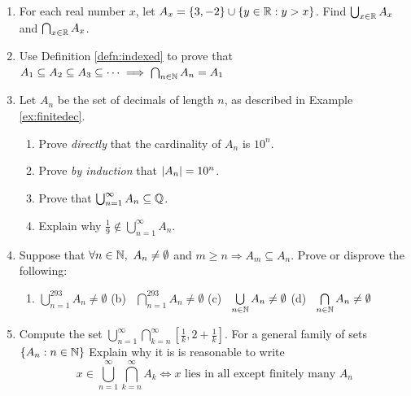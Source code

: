 \begin{exercises}{}{}
\begin{enumerate}
	
	  \item For each real number $x$, let $A_x=\{3,-2\}\cup\{y\in\mathbb{R}:y>x\}$. Find $\bigcup_{x\in\mathbb{R}}A_x$ and $\bigcap_{x\in\mathbb{R}}A_x$.
	  
	  
	  \item Use Definition \ref{defn:indexed} to prove that $A_1\subseteq A_2\subseteq A_3\subseteq\cdots\implies \bigcap_{n\in\mathbb{N}}A_n=A_1$
		
	
			
			
		\item Let $A_n$ be the set of decimals of length $n$, as described in Example \ref{ex:finitedec}.
		\begin{enumerate}
		  \item Prove \emph{directly} that the cardinality of $A_n$ is $10^n$. 
		  \item Prove \emph{by induction} that $\left| A_n\right|=10^n$.
		  \item Prove that $\bigcup_{n=1}^\infty A_n\subseteq\mathbb{Q}$.
			\item Explain why $\frac 19\notin\bigcup_{n=1}^\infty A_n$.
		\end{enumerate}
	
	
	  \item Suppose that $\forall n\in\N,\ A_n\neq\emptyset$ and $m\ge n\Longrightarrow A_m\subseteq A_n$. Prove or disprove the following:
	  \begin{enumerate}
	    \item $\bigcup\limits_{n=1}^{293}A_n\neq\emptyset$\qquad\quad 
	    (b) \ $\bigcap\limits_{n=1}^{293}A_n\neq\emptyset$\qquad\quad
	    (c) \ $\bigcup\limits_{n\in\mathbb{N}} A_n\neq\emptyset$\qquad\quad 
	    (d) \ $\bigcap\limits_{n\in\mathbb{N}} A_n\neq\emptyset$
		\end{enumerate}
		
		
		\item Compute the set $\bigcup_{n=1}^\infty\bigcap_{k=n}^\infty [\frac 1k,2+\frac 1k]$. For a general family of sets $\{A_n:n\in\mathbb{N}\}$ Explain why it is is reasonable to write
		\[
			x\in \bigcup_{n=1}^\infty\bigcap_{k=n}^\infty A_k\iff x\text{ lies in all except finitely many $A_n$}
		\]
		

\end{enumerate}
\end{exercises}
